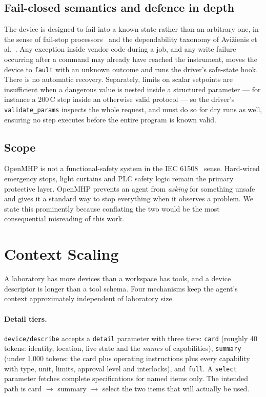 \documentclass[11pt]{article}
\begin{document}
\subsection{Fail-closed semantics and defence in depth}
The device is designed to fail into a known state rather than an arbitrary one, in the
sense of fail-stop processors~\cite{schlichting1983} and the dependability taxonomy of
Avi\v{z}ienis et al.~\cite{avizienis2004}. Any exception inside vendor code during a job, and any write failure occurring after a command
may already have reached the instrument, moves the device to \texttt{fault} with an unknown
outcome and runs the driver's safe-state hook. There is no automatic recovery. Separately,
limits on scalar setpoints are insufficient when a dangerous value is nested inside a
structured parameter --- for instance a 200\,\textdegree C step inside an otherwise valid
protocol --- so the driver's \texttt{validate\_params} inspects the whole request, and must do
so for dry runs as well, ensuring no step executes before the entire program is known valid.

\subsection{Scope}
OpenMHP is not a functional-safety system in the IEC 61508~\cite{iec61508} sense. Hard-wired
emergency stops, light curtains and PLC safety logic remain the primary protective layer.
OpenMHP prevents an agent from \emph{asking} for something unsafe and gives it a standard way
to stop everything when it observes a problem. We state this prominently because conflating
the two would be the most consequential misreading of this work.

\section{Context Scaling}
\label{sec:scale}

A laboratory has more devices than a workspace has tools, and a device descriptor is longer
than a tool schema. Four mechanisms keep the agent's context approximately independent of
laboratory size.

\paragraph{Detail tiers.} \texttt{device/describe} accepts a \texttt{detail} parameter with
three tiers: \texttt{card} (roughly 40 tokens: identity, location, live state and the
\emph{names} of capabilities), \texttt{summary} (under 1{,}000 tokens: the card plus operating
instructions plus every capability with type, unit, limits, approval level and interlocks),
and \texttt{full}. A \texttt{select} parameter fetches complete specifications for named items
only. The intended path is card $\rightarrow$ summary $\rightarrow$ select the two items that
will actually be used.
\end{document}
